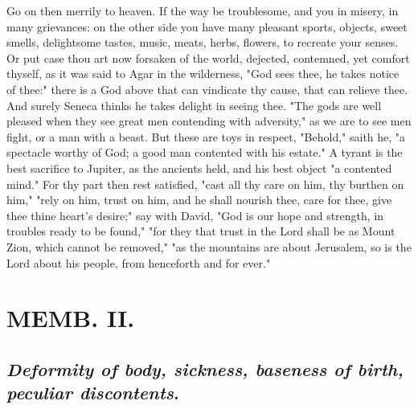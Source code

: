 {Go on then merrily to heaven. If the way be troublesome, and you in misery, in many grievances: on the other side you have many pleasant sports, objects, sweet smells, delightsome tastes, music, meats, herbs, flowers, \etc{} to recreate your senses. Or put case thou art now forsaken of the world, dejected, contemned, yet comfort thyself, as it was said to Agar in the wilderness, "God sees thee, he takes notice of thee:" there is a God above that can vindicate thy cause, that can relieve thee. And surely Seneca thinks he takes delight in seeing thee. "The gods are well pleased when they see great men contending with adversity," as we are to see men fight, or a man with a beast. But these are toys in respect, "Behold," saith he, "a spectacle worthy of God; a good man contented with his estate." A tyrant is the best sacrifice to Jupiter, as the ancients held, and his best object "a contented mind." For thy part then rest satisfied, "cast all thy care on him, thy burthen on him," "rely on him, trust on him, and he shall nourish thee, care for thee, give thee thine heart's desire;" say with David, "God is our hope and strength, in troubles ready to be found,"  "for they that trust in the Lord shall be as Mount Zion, which cannot be removed,"  "as the mountains are about Jerusalem, so is the Lord about his people, from henceforth and for ever."

\chapter{ MEMB. II.}


\section{\emph{Deformity of body, sickness, baseness of birth, peculiar discontents}.}


}

